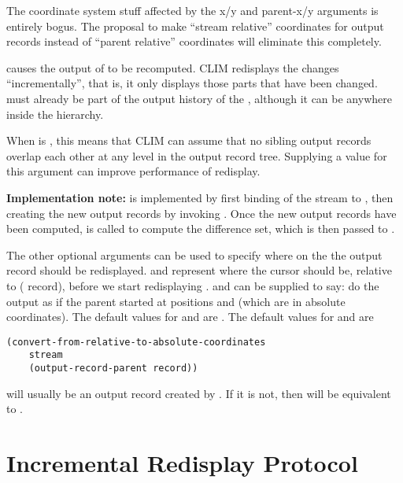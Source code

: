  {The coordinate system stuff affected by the x/y and parent-x/y
arguments is entirely bogus.  The proposal to make ``stream relative''
coordinates for output records instead of ``parent relative'' coordinates will
eliminate this completely.}

 causes the output of
 to be recomputed.
CLIM redisplays the changes ``incrementally'', that is, it only displays those
parts that have been changed.  must already be part of the output
history of the  , although it can be
anywhere inside the hierarchy.

When  is , this means that CLIM can assume
that no sibling output records overlap each other at any level in the output
record tree.  Supplying a  value for this argument can improve
performance of redisplay.

{\bf Implementation note:}  is implemented by first
binding  of the stream to , then creating
the new output records by invoking .  Once the
new output records have been computed,  is called to
compute the difference set, which is then passed to
.

The other optional arguments can be used to specify where on the 
the output record should be redisplayed.   and  represent where
the cursor should be, relative to ( record), before we
start redisplaying .   and  can be
supplied to say: do the output as if the parent started at positions
 and  (which are in absolute coordinates).  The
default values for  and  are .  The default values for  and  are

\begin{verbatim}
(convert-from-relative-to-absolute-coordinates 
    stream
    (output-record-parent record))
\end{verbatim}

 will usually be an output record created by .
If it is not, then  will be equivalent to
.


\section {Incremental Redisplay Protocol}

